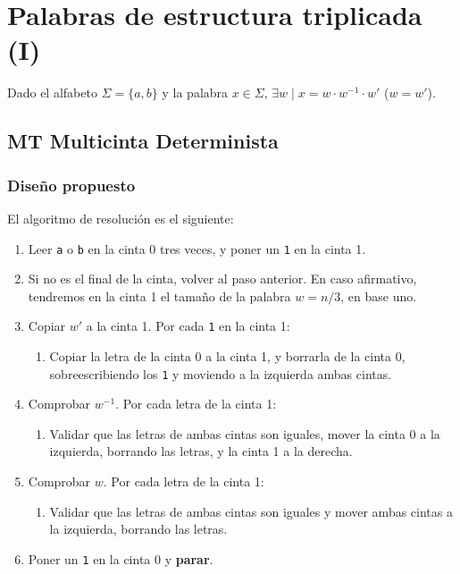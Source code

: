 \section{Palabras de estructura triplicada (I)}
Dado el alfabeto $\Sigma = \{a,b\}$ y la palabra $x \in \Sigma$, $\exists w \mid x = w \cdot w^{-1} \cdot w'$ ($w=w'$).


\subsection{MT Multicinta Determinista}

\subsubsection*{Diseño propuesto}
El algoritmo de resolución es el siguiente:

\begin{enumerate}
    \item Leer \texttt{a} o \texttt{b} en la cinta 0 tres veces, y poner un \texttt{1} en la cinta 1.
    \item Si no es el final de la cinta, volver al paso anterior. En caso afirmativo, tendremos en la cinta 1 el tamaño de la palabra $w = n/3$, en base uno.
    \item Copiar $w'$ a la cinta 1. Por cada \texttt{1} en la cinta 1:
    \begin{enumerate}[1.]
        \item Copiar la letra de la cinta 0 a la cinta 1, y borrarla de la cinta 0, sobreescribiendo los \texttt{1} y moviendo a la izquierda ambas cintas.
    \end{enumerate}
    \item Comprobar $w^{-1}$. Por cada letra de la cinta 1:
    \begin{enumerate}[1.]
        \item Validar que las letras de ambas cintas son iguales, mover la cinta 0 a la izquierda, borrando las letras, y la cinta 1 a la derecha.
    \end{enumerate}
    \item Comprobar $w$. Por cada letra de la cinta 1:
    \begin{enumerate}[1.]
        \item Validar que las letras de ambas cintas son iguales y mover ambas cintas a la izquierda, borrando las letras.
    \end{enumerate}
    \item Poner un \texttt{1} en la cinta 0 y \textbf{parar}.
\end{enumerate}

